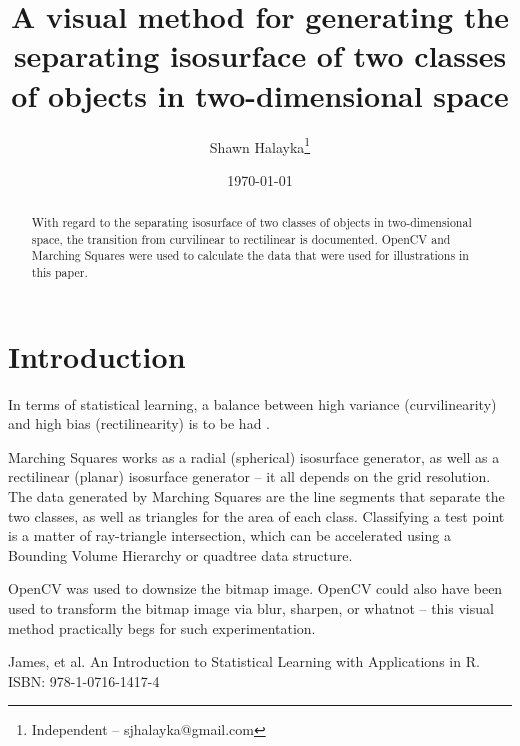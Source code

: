 \documentclass[12pt]{article}
\title{A visual method for generating the separating isosurface of two classes of objects in two-dimensional space}
\author{
Shawn Halayka\footnote{Independent -- sjhalayka@gmail.com}
}
\date{\today\;\currenttime}
\begin{document}
\maketitle

\begin{abstract}
With regard to the separating isosurface of two classes of objects in two-dimensional space, the transition from curvilinear to rectilinear is documented.
OpenCV and Marching Squares were used to calculate the data that were used for illustrations in this paper.
\end{abstract}




\section{Introduction}

In terms of statistical learning, a balance between high variance (curvilinearity) and high bias (rectilinearity) is to be had \cite{james}.

Marching Squares works as a radial (spherical) isosurface generator, as well as a rectilinear (planar) isosurface generator -- it all depends on the grid resolution.
The data generated by Marching Squares are the line segments that separate the two classes, as well as triangles for the area of each class.
Classifying a test point is a matter of ray-triangle intersection, which can be accelerated using a Bounding Volume Hierarchy or quadtree data structure.

OpenCV was used to downsize the bitmap image.
OpenCV could also have been used to transform the bitmap image via blur, sharpen, or whatnot -- this visual method practically begs for such experimentation.



\begin{thebibliography}{9}

 James, et al. An Introduction to Statistical Learning with Applications in R. ISBN: 978-1-0716-1417-4

\end{thebibliography}
\end{document}
